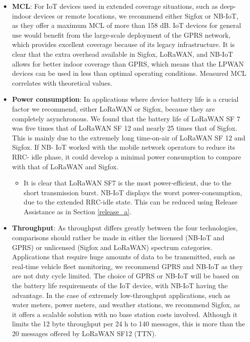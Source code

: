\documentclass[]{article}
\providecommand{\tightlist}{%
  \setlength{\itemsep}{0pt}\setlength{\parskip}{0pt}}
\begin{document}
\begin{itemize}
\tightlist
\item
  \textbf{MCL}: For IoT devices used in extended coverage situations,
  such as deep-indoor devices or remote locations, we recommend either
  Sigfox or NB-IoT, as they offer a maximum MCL of more than 158 dB. IoT
  devices for general use would benefit from the large-scale deployment
  of the GPRS network, which provides excellent coverage because of its
  legacy infrastructure. It is clear that the extra overhead available
  in Sigfox, LoRaWAN, and NB-IoT allows for better indoor coverage than
  GPRS, which means that the LPWAN devices can be used in less than
  optimal operating conditions. Measured MCL correlates with theoretical
  values.
\item
  \textbf{Power consumption}: In applications where device battery life
  is a crucial factor we recommend, either LoRaWAN or Sigfox, because
  they are completely asynchronous. We found that the battery life of
  LoRaWAN SF 7 was five times that of LoRaWAN SF 12 and nearly 25 times
  that of Sigfox. This is mainly due to the extremely long time-on-air
  of LoRaWAN SF 12 and Sigfox. If NB- IoT worked with the mobile network
  operators to reduce its RRC- idle phase, it could develop a minimal
  power consumption to compare with that of LoRaWAN and Sigfox.

  \begin{itemize}
  \tightlist
  \item
    It is clear that LoRaWAN SF7 is the most power-efficient, due to the
    short transmission burst. NB-IoT displays the worst
    power-consumption, due to the extended RRC-idle state. This can be
    reduced using Release Assistance as in Section \ref{release_a}.
  \end{itemize}
\item
  \textbf{Throughput}: As throughput differs greatly between the four
  technologies, comparisons should rather be made in either the licensed
  (NB-IoT and GPRS) or unlicensed (Sigfox and LoRaWAN) spectrum
  categories. Applications that require huge amounts of data to be
  transmitted, such as real-time vehicle fleet monitoring, we recommend
  GPRS and NB-IoT as they are not duty cycle limited. The choice of GPRS
  or NB-IoT will be based on the battery life requirements of the IoT
  device, with NB-IoT having the advantage. In the case of extremely
  low-throughput applications, such as water meters, power meters, and
  weather stations, we recommend Sigfox, as it offers a scalable
  solution with no base station costs involved. Although it limits the
  12 byte throughput per 24 h to 140 messages, this is more than the 20
  messages offered by LoRaWAN SF12 (TTN).


\end{itemize}
\end{document}
